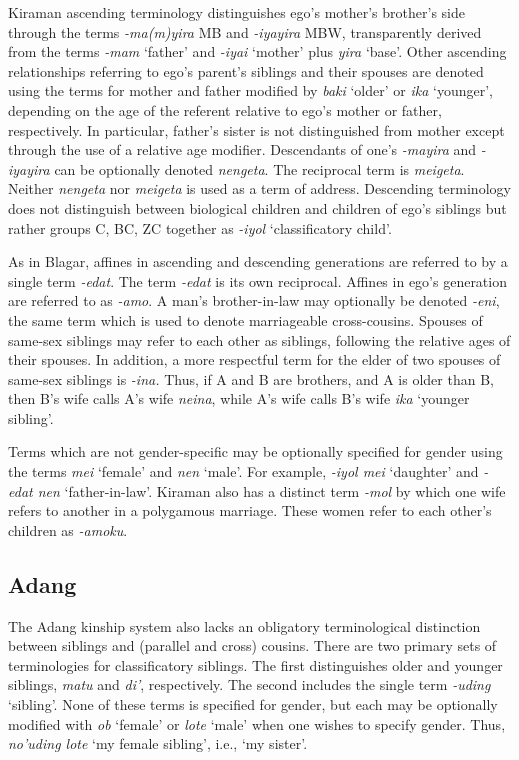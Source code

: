 Kiraman ascending terminology distinguishes ego's mother's brother's side through the terms \textit{-ma(m)yira} MB and \textit{-iyayira} MBW, transparently derived from the terms \textit{-mam} `father' and \textit{-iyai} `mother' plus \textit{yira} `base'. Other ascending relationships referring to ego's parent's siblings and their spouses are denoted using the terms for mother and father modified by \textit{baki} `older' or \textit{ika} `younger', depending on the age of the referent relative to ego's mother or father, respectively. In particular, father's sister is not distinguished from mother except through the use of a relative age modifier. Descendants of one's \textit{-mayira} and \textit{-iyayira} can be optionally denoted \textit{nengeta}. The reciprocal term is \textit{meigeta}. Neither \textit{nengeta} nor \textit{meigeta} is used as a term of address. Descending terminology does not distinguish between biological children and children of ego's siblings but rather groups C, BC, ZC together as \textit{-iyol} `classificatory child'.

As in Blagar, affines in ascending and descending generations are referred to by a single term \textit{-edat}. The term \textit{-edat} is its own reciprocal. Affines in ego's generation are referred to as \textit{-amo}. A man's brother-in-law may optionally be denoted \textit{-eni}, the same term which is used to denote marriageable cross-cousins. Spouses of same-sex siblings may refer to each other as siblings, following the relative ages of their spouses. In addition, a more respectful term for the elder of two spouses of same-sex siblings is \textit{-ina.} Thus, if A and B are brothers, and A is older than B, then B's wife calls A's wife \textit{neina}, while A's wife calls B's wife \textit{ika} `younger sibling'. 

 



Terms which are not gender-specific may be optionally specified for gender using the terms \textit{mei} `female' and \textit{nen} `male'. For example, \textit{-iyol mei} `daughter' and \textit{{}-edat nen} `father-in-law'. Kiraman also has a distinct term \textit{-mol} by which one wife refers to another in a polygamous marriage. These women refer to each other's children as \textit{-amoku}. 


\subsection{Adang}\label{sect_adang}
The Adang kinship system also lacks an obligatory terminological distinction between siblings and (parallel and cross) cousins. There are two primary sets of terminologies for classificatory siblings. The first distinguishes older and younger siblings, \textit{matu} and \textit{di'}, respectively. The second includes the single term \textit{-uding} `sibling'. None of these terms is specified for gender, but each may be optionally modified with \textit{ob} `female' or \textit{lote} `male' when one wishes to specify gender. Thus, \textit{no'uding lote} `my female sibling', i.e., `my sister'. 

